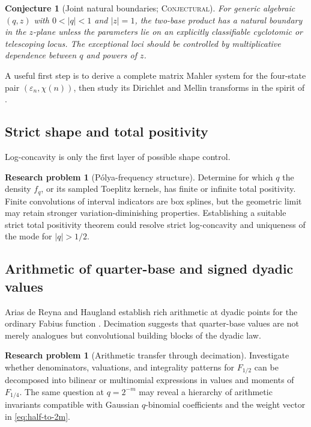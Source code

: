 \documentclass[11pt,oneside]{article}
\newtheorem{conjecture}[theorem]{Conjecture}
\theoremstyle{definition}
\newtheorem{problem}[theorem]{Research problem}
\theoremstyle{remark}
\newcommand{\epsTM}{\varepsilon}
\newcommand{\Conjectural}{\textsc{Conjectural}}
\begin{document}
\begin{conjecture}[Joint natural boundaries; \Conjectural]
For generic algebraic \((q,z)\) with \(0<|q|<1\) and \(|z|=1\), the two-base
product has a natural boundary in the \(z\)-plane unless the parameters lie on
an explicitly classifiable cyclotomic or telescoping locus.  The exceptional
loci should be controlled by multiplicative dependence between \(q\) and
powers of \(z\).
\end{conjecture}

A useful first step is to derive a complete matrix Mahler system for the
four-state pair \((\epsTM_n,\chi(n))\), then study its Dirichlet and Mellin
transforms in the spirit of \cite{toth}.

\subsection{Strict shape and total positivity}
Log-concavity is only the first layer of possible shape control.

\begin{problem}[P\'olya-frequency structure]
Determine for which \(q\) the density \(f_q\), or its sampled Toeplitz kernels,
has finite or infinite total positivity.  Finite convolutions of interval
indicators are box splines, but the geometric limit may retain stronger
variation-diminishing properties.  Establishing a suitable strict total
positivity theorem could resolve strict log-concavity and uniqueness of the
mode for \(|q|>1/2\).
\end{problem}

\subsection{Arithmetic of quarter-base and signed dyadic values}
Arias de Reyna and Haugland establish rich arithmetic at dyadic points for the
ordinary Fabius function \cite{arias-arithmetic,haugland}.  Decimation suggests
that quarter-base values are not merely analogues but convolutional building
blocks of the dyadic law.

\begin{problem}[Arithmetic transfer through decimation]
Investigate whether denominators, valuations, and integrality patterns for
\(F_{1/2}\) can be decomposed into bilinear or multinomial expressions in
values and moments of \(F_{1/4}\).  The same question at
\(q=2^{-m}\) may reveal a hierarchy of arithmetic invariants compatible with
Gaussian \(q\)-binomial coefficients and the weight vector in
\eqref{eq:half-to-2m}.
\end{problem}
\end{document}
